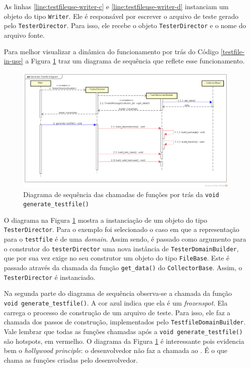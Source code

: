 As linhas \ref{line:testfileuse-writer-c} e \ref{line:testfileuse-writer-d}
instanciam um objeto do tipo \lstinline|Writer|. Ele é responsável por escrever
o arquivo de teste gerado pelo \lstinline|TesterDirector|. Para isso, ele
recebe o objeto \lstinline|TesterDirector| e o nome do arquivo fonte.

Para melhor visualizar a dinâmica do funcionamento por trás do Código
\ref{testfile-in-use} a Figura \ref{generate-testfile-sequence-diagram}
traz um diagrama de sequência que reflete esse funcionamento.

\begin{landscape}
\begin{figure}[h]
  \centering
    \includegraphics[width=1.5\textwidth]{figuras/generate-testfile-sequence-diagram.png}
    \caption{Diagrama de sequência das chamadas de funções por trás da \lstinline|void generate_testfile()|}
    \label{generate-testfile-sequence-diagram}
\end{figure}
\FloatBarrier
\end{landscape}

O diagrama na Figura \ref{generate-testfile-sequence-diagram} mostra a instanciação
de um objeto do tipo \lstinline|TesterDirector|. Para o exemplo foi selecionado
o caso em que a representação para o \lstinline|testfile| é de uma
\textit{domain}. Assim sendo, é passado como argumento para o construtor do
\lstinline|testerDirector| uma nova instância de \lstinline|TesterDomainBuilder|,
que por sua vez exige no seu construtor um objeto do tipo \lstinline|FileBase|.
Este é passado através da chamada da função \lstinline|get_data()| do
\lstinline|CollectorBase|. Assim, o \lstinline|TesterDirector| é instanciado.

Na segunda parte do diagrama de sequência observa-se a chamada da função
\lstinline|void generate_testfile()|. A cor azul indica que ela é um
\textit{frozenspot}. Ela carrega o processo de construção de um
arquivo de teste. Para isso, ele faz a chamada dos passos de construção,
implementados pelo \lstinline|TestfileDomainBuilder|. Vale lembrar que
todas as funções chamadas após a \lstinline|void generate_testfile()| são
hotspots, em vermelho. O diagrama da Figura \ref{generate-testfile-sequence-diagram}
é interessante pois evidencia bem o \textit{hollywood principle}: o
desenvolvedor não faz a chamada ao \framework. É o \framework que chama
as funções criadas pelo desenvolvedor.


